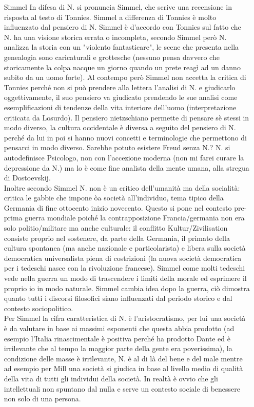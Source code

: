 \documentclass[10pt,a4paper]{article}
\begin{document}
\begin{itemize}
\item[Simmel] In difesa di N. si pronuncia Simmel, che scrive una recensione in risposta al testo di Tonnies. Simmel a differenza di Tonnies è molto influenzato dal pensiero di N. Simmel è d'accordo con Tonnies sul fatto che N. ha una visione storica errata o incompleta, secondo Simmel però N. analizza la storia con un "violento fantasticare", le scene che presenta nella genealogia sono caricaturali e grottesche (nessuno pensa davvero che storicamente la colpa nacque un giorno quando un prete reagì ad un danno subito da un uomo forte). Al contempo però Simmel non accetta la critica di Tonnies perché non si può prendere alla lettera l'analisi di N. e giudicarlo oggettivamente, il suo pensiero va giudicato prendendo le sue analisi come esemplificazioni di tendenze della vita interiore dell'uomo (interpretazione criticata da Losurdo). Il pensiero nietzschiano permette di pensare sè stessi in modo diverso, la cultura occidentale è diversa a seguito del pensiero di N. perché da lui in poi si hanno nuovi concetti e terminologie che permettono di pensarci in modo diverso. Sarebbe potuto esistere Freud senza N.? N. si autodefinisce Psicologo, non con l'accezione moderna (non mi farei curare la depressione da N.) ma lo è come fine analista della mente umana, alla stregua di Dostoevskij.\\
Inoltre secondo Simmel N. non è un critico dell'umanità ma della socialità: critica le gabbie che impone òa società all'individuo, tema tipico della Germania di fine ottocento inizio novecento. Questo si pone nel contesto pre-prima guerra mondiale poiché la contrapposizione Francia/germania non era solo politio/militare ma anche culturale: il conflitto Kultur/Zivilisation consiste proprio nel sostenere, da parte della Germania, il primato della cultura spontanea (ma anche nazionale e particolarista) e libera sulla società democratica universalista piena di costrizioni (la nuova società democratica per i tedeschi nasce con la rivoluzione francese). Simmel come molti tedeschi vede nella guerra un modo di trascendere i limiti della morale ed esprimere il proprio io in modo naturale. Simmel cambia idea dopo la guerra, ciò dimostra quanto tutti i discorsi filosofici siano influenzati dal periodo storico e dal contesto sociopolitico.\\
Per Simmel la cifra caratteristica di N. è l'aristocratismo, per lui una società è da valutare in base ai massimi esponenti che questa abbia prodotto (ad esempio l'Italia rinascimentale è positiva perché ha prodotto Dante ed è irrilevante che al tempo la maggior parte della gente era poverissima), la condizione delle masse è irrilevante, N. è al di là del bene e del male mentre ad esempio per Mill una società si giudica in base al livello medio di qualità della vita di tutti gli individui della società. In realtà è ovvio che gli intellettuali non spuntano dal nulla e serve un contesto sociale di benessere non solo di una persona.\\

\end{itemize}
\end{document}
